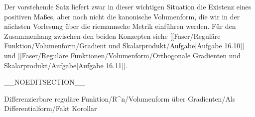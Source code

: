 Der vorstehende Satz liefert zwar in dieser wichtigen Situation die Existenz eines positiven Maßes, aber noch nicht die kanonische Volumenform, die wir in der nächsten Vorlesung über die riemannsche Metrik einführen werden. Für den Zusammenhang zwischen den beiden Konzepten siehe
[[Faser/Reguläre Funktion/Volumenform/Gradient und Skalarprodukt/Aufgabe|Aufgabe 16.10]]
und
[[Faser/Reguläre Funktionen/Volumenform/Orthogonale Gradienten und Skalarprodukt/Aufgabe|Aufgabe 16.11]].

__NOEDITSECTION__

{Differenzierbare reguläre Funktion/R^n/Volumenform über Gradienten/Als Differentialform/Fakt}
{Korollar}
{}
{

\faktzusatz {}
\faktzusatz {}

}
